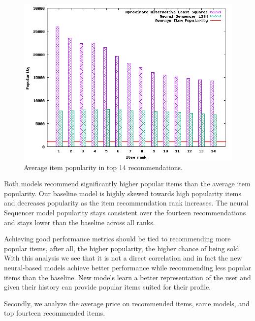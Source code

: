 \documentclass{kththesis}
\begin{document}
\begin{figure}[H]
    \centering
    \includegraphics[scale=0.75]{charts/popularity.png}
    \caption{Average item popularity in top 14 recommendations.}
\end{figure}

Both models recommend significantly higher popular items than the average item popularity. Our baseline model is highly skewed towards high popularity items and decreases popularity as the item recommendation rank increases. The neural Sequencer model popularity stays consistent over the fourteen recommendations and stays lower than the baseline across all ranks. 

Achieving good performance metrics should be tied to recommending more popular items, after all, the higher popularity, the higher chance of being sold. With this analysis we see that it is not a direct correlation and in fact the new neural-based models achieve better performance while recommending less popular items than the baseline. New models learn a better representation of the user and given their history can provide popular items suited for their profile. 

Secondly, we analyze the average price on recommended items, same models, and top fourteen recommended items.
\end{document}
